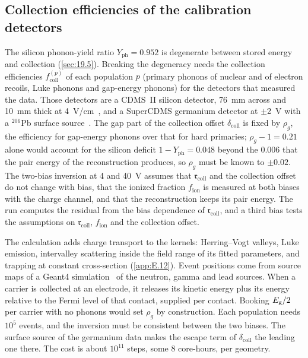 \subsection{Collection efficiencies of the calibration detectors}

The silicon phonon-yield ratio $Y_{\mathrm{ph}} = 0.952$ is degenerate between stored energy and collection (\cref{sec:19.5}). Breaking the degeneracy needs the collection efficiencies $f^{(p)}_{\mathrm{coll}}$ of each population $p$ (primary phonons of nuclear and of electron recoils, Luke phonons and gap-energy phonons) for the detectors that measured the data. Those detectors are a CDMS~II silicon detector, \SI{76}{mm} across and \SI{10}{mm} thick at \SI{4}{V/cm}~\cite[Sect.~2]{agnese2018nuclear}, and a SuperCDMS germanium detector at $\pm$\SI{2}{V} with a $^{206}$Pb surface source~\cite{agnese2018energy}. The gap part of the collection offset $\delta_{\mathrm{coll}}$ is fixed by $\rho_g$, the efficiency for gap-energy phonons over that for hard primaries; $\rho_g - 1 = 0.21$ alone would account for the silicon deficit $1 - Y_{\mathrm{ph}} = 0.048$ beyond the 0.006 that the pair energy of the reconstruction produces, so $\rho_g$ must be known to $\pm 0.02$. The two-bias inversion at 4 and \SI{40}{V} assumes that $\mathfrak{r}_{\mathrm{coll}}$ and the collection offset do not change with bias, that the ionized fraction $f_{\mathrm{ion}}$ is measured at both biases with the charge channel, and that the reconstruction keeps its pair energy. The run computes the residual from the bias dependence of $\mathfrak{r}_{\mathrm{coll}}$, and a third bias tests the assumptions on $\mathfrak{r}_{\mathrm{coll}}$, $f_{\mathrm{ion}}$ and the collection offset.

The calculation adds charge transport to the kernels: Herring--Vogt valleys, Luke emission, intervalley scattering inside the field range of its fitted parameters, and trapping at constant cross-section (\cref{app:E.12}). Event positions come from source maps of a Geant4 simulation~\cite{agostinelli2003geant4} of the neutron, gamma and lead sources. When a carrier is collected at an electrode, it releases its kinetic energy plus its energy relative to the Fermi level of that contact, supplied per contact. Booking $E_{\mathrm{g}}/2$ per carrier with no phonons would set $\rho_g$ by construction. Each population needs $10^5$ events, and the inversion must be consistent between the two biases. The surface source of the germanium data makes the escape term of $\delta_{\mathrm{coll}}$ the leading one there. The cost is about $10^{11}$ steps, some 8 core-hours, per geometry.

